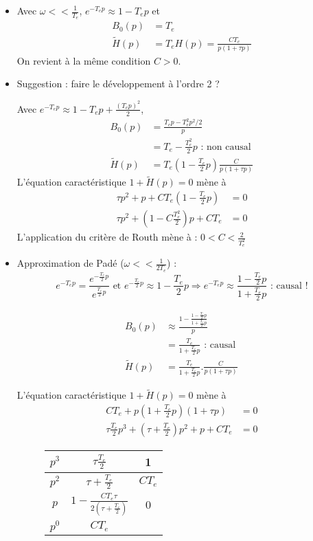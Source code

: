 \documentclass[../main.tex]{subfiles}
\begin{document}
\begin{enumerate}
\begin{itemize}
\item Avec $\omega << \frac{1}{T_e}$, $e^{-T_ep} \approx 1 - T_ep$ et
\begin{align*}
B_0(p) & = T_e \\
\tilde{H}(p) & = T_e H(p) = \frac{CT_e}{p(1+\tau p)}
\end{align*}
On revient à la même condition $ C > 0 $.

\item Suggestion : faire le développement à l'ordre 2 ?

Avec $e^{-T_e p} \approx 1 - T_ep + \frac{(T_ep)^2}{2}$,
\begin{align*}
B_0(p) & = \frac{T_ep-T_e^2p^2 / 2 }{p}\\
& = T_e - \frac{T_e^2}{2}p \text{ : non causal} \\
\tilde{H}(p) & = T_e(1-\frac{T_e}{2}p)\frac{C}{p(1+\tau p)}
\end{align*}
L'équation caractéristique $1+\tilde{H}(p) = 0$ mène à
\begin{align*}
\tau p^2 + p + CT_e(1-\frac{T_e}{2}p) & = 0 \\
\tau p^2 + (1-C\frac{T_e^2}{2})p + CT_e & = 0
\end{align*}
L'application du critère de Routh mène à : $0 < C < \frac{2}{T_e^2}$

\item Approximation de Padé ($\omega << \frac{1}{2T_e}$) :
\[ e^{-T_ep} = \frac{e^{-\frac{T_e}{2}p}}{e^{\frac{T_e}{2}p}} \text{ et } e^{-\frac{T_e}{2}p} \approx 1 -
\frac{T_e}{2}p \Longrightarrow e^{-T_ep} \approx \frac{1 - \frac{T_e}{2}p}{1 + \frac{T_e}{2}p} \text{ : causal !} \]

\begin{align*}
B_0(p) & \approx \frac{1-\frac{1 - \frac{T_e}{2}p}{1 + \frac{T_e}{2}p}}{p} \\
& = \frac{T_e}{1+\frac{T_e}{2}p} \text{ : causal } \\
\tilde{H}(p) & = \frac{T_e}{1+\frac{T_e}{2}p} . \frac{C}{p(1+\tau p)}
\end{align*}

L'équation caractéristique $1+\tilde{H}(p)=0$ mène à
\begin{align*}
CT_e + p (1+\frac{T_e}{2}p)(1+\tau p) & = 0 \\
\tau\frac{T_e}{2}p^3 + (\tau+\frac{T_e}{2})p^2 + p + CT_e &= 0
\end{align*}

\begin{figure}[h!]
\centering
\begin{tabular}{|c|c|c|}
\hline
$p^3$ & $\tau \frac{T_e}{2}$ & 1 \\
\hline
$p^2$ & $\tau + \frac{T_e}{2} $ & $CT_e$ \\
\hline
$p$ & $1- \frac{CT_e \tau}{2(\tau + \frac{T_e}{2})}$ & 0 \\
\hline
$p^0$ & $CT_e$ &  \\
\hline
\end{tabular}
\end{figure}


\end{itemize}
\end{enumerate}
\end{document}
